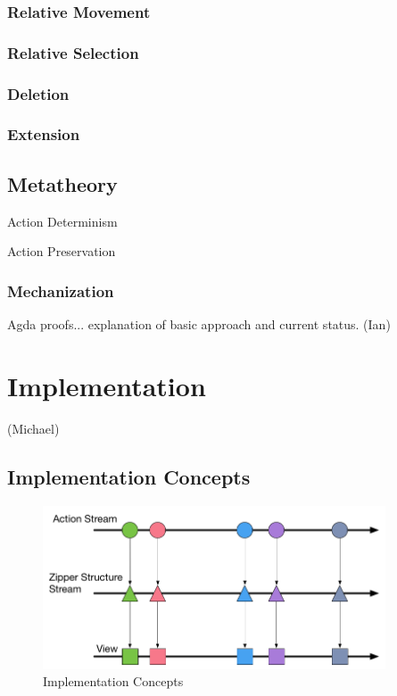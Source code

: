 \documentclass{llncs}
\begin{document}
\subsubsection{Relative Movement}

\subsubsection{Relative Selection}

\subsubsection{Deletion}

\subsubsection{Extension}

\subsection{Metatheory}
Action Determinism

Action Preservation

\subsubsection{Mechanization}
Agda proofs... explanation of basic approach and current status. (Ian)

\section{Implementation}
(Michael)

\subsection{Implementation Concepts} 


\begin{figure}[]
\centering
\includegraphics[width=4in]{Implementation_Diagram}
\caption{Implementation Concepts}
\label{fig:FRP}
\end{figure}
\end{document}
